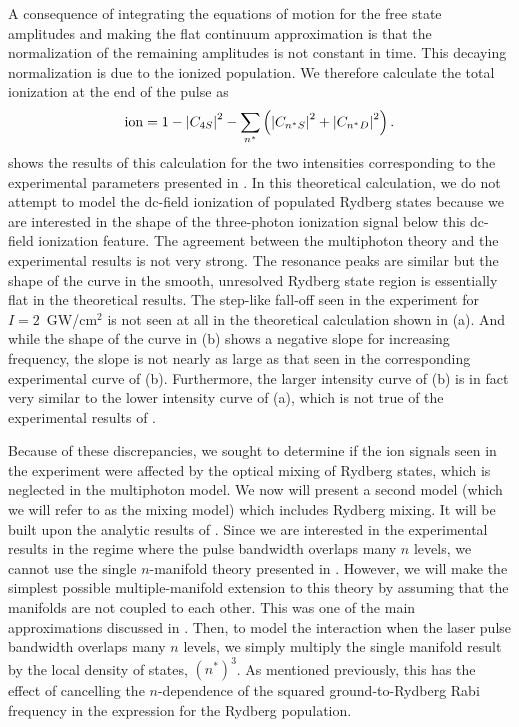 A consequence of integrating the equations of motion for the free state
amplitudes and making the flat continuum approximation is that the
normalization of the remaining amplitudes is not constant in time.  This
decaying normalization is due to the ionized population.  We therefore
calculate the total ionization at the end of the pulse as
\begin{equation}
{\rm ion} = 1 - \left|C_{4S}\right|^2 - \sum_{n^*} \left(
\left|C_{n^*S}\right|^2 + \left|C_{n^*D}\right|^2 \right).
\end{equation}
 shows the results of this calculation for the two intensities
corresponding to the experimental parameters presented in .  In
this theoretical calculation, we do not attempt to model the dc-field ionization
of populated Rydberg states because we are interested in the shape of the
three-photon ionization signal below this dc-field ionization feature.  The
agreement between the multiphoton theory and the experimental results is not
very strong.  The resonance peaks are similar but the shape of the curve in the
smooth, unresolved Rydberg state region is essentially flat in the theoretical
results.  The step-like fall-off seen in the experiment for $I=2$~GW/cm$^2$ is
not seen at all in the theoretical calculation shown in (a).  And
while the shape of the curve in
(b) shows a negative slope for increasing frequency, the slope is
not nearly as large as that seen in the corresponding experimental curve of
(b).  Furthermore, the larger intensity curve of
(b) is in fact very similar to the lower intensity curve of
(a), which is not true of the experimental results of
.

Because of these discrepancies, we sought to determine if the ion signals
seen in the experiment were affected by the optical mixing of Rydberg
states, which is neglected in the multiphoton model.  We now will present a
second model (which we will refer to as the mixing model) which includes
Rydberg mixing.  It will be built upon the analytic results of
.  Since we are interested in the experimental results in the
regime where the pulse bandwidth overlaps many
$n$ levels, we cannot use the single $n$-manifold theory presented in
.  However, we will make the simplest possible multiple-manifold
extension to this theory by assuming that the manifolds are not coupled to each
other.  This was one of the main approximations discussed in . 
Then, to model the interaction when the laser pulse bandwidth overlaps many
$n$ levels, we simply multiply the single manifold result by the local density
of states, $(n^*)^3$.  As mentioned previously, this has the effect of cancelling
the $n$-dependence of the squared ground-to-Rydberg Rabi frequency in the
expression for the Rydberg population.

